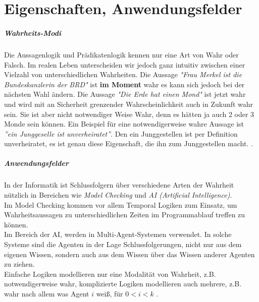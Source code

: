 
\chapter{Eigenschaften, Anwendungsfelder} %
\label{sec:eigenschaften_anwendungsfelder}

\paragraph{Wahrheits-Modi} %
\label{par:wahrheits_modi}

Die Aussagenlogik und Prädikatenlogik kennen nur eine Art von Wahr oder Falsch. Im realen Leben unterscheiden wir jedoch ganz intuitiv zwischen einer Vielzahl von unterschiedlichen Wahrheiten.
Die Aussage \emph{"Frau Merkel ist die Bundeskanzlerin der BRD"} ist \textbf{im Moment} wahr es kann sich jedoch bei der nächsten Wahl ändern.
Die Aussage \emph{"Die Erde hat einen Mond"} ist jetzt wahr und wird mit an Sicherheit grenzender Wahrscheinlichkeit auch in Zukunft wahr sein. 
Sie ist aber nicht notwendiger Weise Wahr, denn es hätten ja auch 2 oder 3 Monde sein können.
Ein Beispiel für eine notwendigerweise wahre Aussage ist \emph{''ein Junggeselle ist unverheiratet''}. Den ein Junggestellen ist per Definition unverheiratet, es ist genau diese Eigenschaft, die ihn zum Junggestellen macht. .


\paragraph{Anwendungsfelder} %
\label{par:anwendungsfelder}

In der Informatik ist Schlussfolgern über verschiedene Arten der Wahrheit nützlich in Bereichen wie \emph{Model Checking} und \emph{AI (Artificial Intelligence)}. \\
Im Model Checking kommen vor allem Temporal Logiken zum Einsatz, um Wahrheitsaussagen zu unterschiedlichen Zeiten im Programmablauf treffen zu können. \\
Im Bereich der AI, werden \MMLn in Multi-Agent-Systemen verwendet. 
In solche Systeme sind die Agenten in der Lage Schlussfolgerungen, nicht nur aus dem eigenen Wissen, sondern auch aus dem Wissen über das Wissen anderer Agenten zu ziehen.\\
Einfache Logiken modellieren nur eine Modalität von Wahrheit, z.B. notwendigerweise wahr, komplizierte Logiken modellieren auch mehrere, z.B. wahr nach allem was Agent $i$ weiß, für $ 0 < i < k$ .\\

